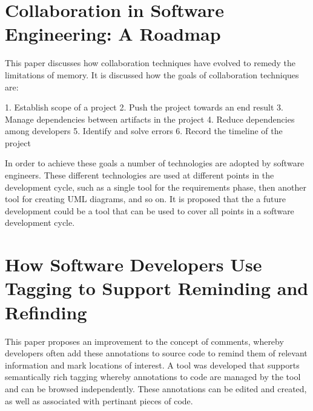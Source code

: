 \documentclass{l4proj}
\begin{document}
\section {Collaboration in Software Engineering: A Roadmap}

This paper discusses how collaboration techniques have evolved to remedy the limitations of memory. It is discussed how the goals of collaboration techniques are:

1. Establish scope of a project
2. Push the project towards an end result
3. Manage dependencies between artifacts in the project
4. Reduce dependencies among developers
5. Identify and solve errors
6. Record the timeline of the project

In order to achieve these goals a number of technologies are adopted by software engineers.  These different technologies are used at different points in the development cycle, such as a single tool for the requirements phase, then another tool for creating UML diagrams, and so on.  It is proposed that the a future development could be a tool that can be used to cover all points in a software development cycle.

\section {How Software Developers Use Tagging to Support Reminding and Refinding}

This paper proposes an improvement to the concept of comments, whereby developers often add these annotations to source code to remind them of relevant information and mark locations of interest.  A tool was developed that supports semantically rich tagging whereby annotations to code are managed by the tool and can be browsed independently.  These annotations can be edited and created, as well as associated with pertinant pieces of code.






\begin{appendices}


\end{appendices}




\end{document}
